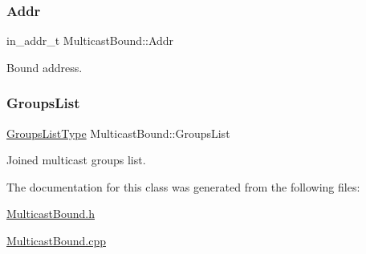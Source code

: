 \subsubsection{\texorpdfstring{Addr}{Addr}}
{\footnotesize\ttfamily in\+\_\+addr\+\_\+t Multicast\+Bound\+::\+Addr\hspace{0.3cm}{\ttfamily [protected]}}



Bound address. 

\mbox{\label{classMulticastBound_a717064ed29a84f4cc2c514eb3b1e695f}} 
\subsubsection{\texorpdfstring{Groups\+List}{GroupsList}}
{\footnotesize\ttfamily \hyperlink{MulticastBound_8h_a9584173a620a338ea7d88264229e36dd}{Groups\+List\+Type} Multicast\+Bound\+::\+Groups\+List\hspace{0.3cm}{\ttfamily [protected]}}



Joined multicast groups list. 



The documentation for this class was generated from the following files\+:\begin{DoxyCompactItemize}
\item 
\hyperlink{MulticastBound_8h}{Multicast\+Bound.\+h}\item 
\hyperlink{MulticastBound_8cpp}{Multicast\+Bound.\+cpp}\end{DoxyCompactItemize}

